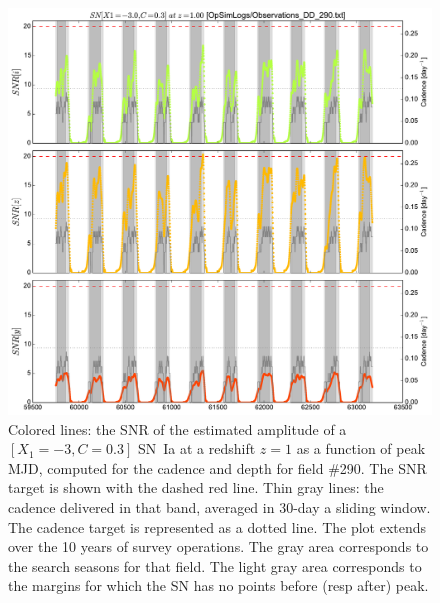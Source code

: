 \documentclass[\docopts]{\docclass}
\begin{document}
\begin{figure}[t]
  \begin{center}
    \includegraphics[width=\linewidth]{metric_DD_290.pdf}
    \caption{Colored lines: the SNR of the estimated amplitude of a
      $[X_1=-3, C=0.3]$ SN~Ia at a redshift $z = 1$ as a function of
      peak MJD, computed for the  cadence and depth
      for field \#290. The SNR target is shown with the dashed red
      line.  Thin gray lines: the cadence delivered in that band,
      averaged in 30-day a sliding window.  The cadence target is
      represented as a dotted line. The plot extends over the 10 years
      of survey operations. The gray area corresponds to the search
      seasons for that field. The light gray area corresponds to the
      margins for which the SN has no points before (resp after)
      peak.}
  \end{center}
\end{figure}
\end{document}

